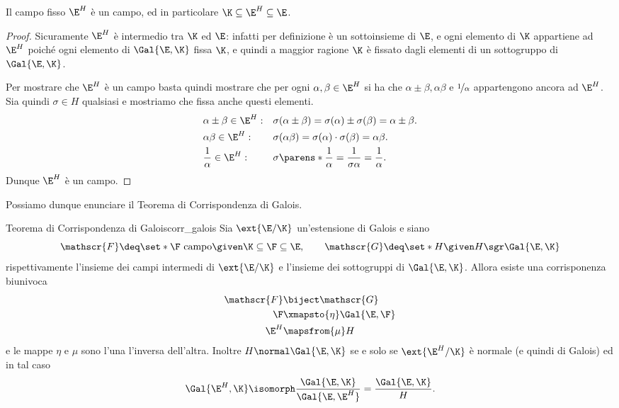 \begin{proposition}
    {}{}
    Il campo fisso $\E^H$ è un campo, ed in particolare $\K \subseteq \E^H \subseteq \E$. 
\end{proposition}
\begin{proof}
    Sicuramente $\E^H$ è intermedio tra $\K$ ed $\E$: infatti per definizione è un sottoinsieme di $\E$, e ogni elemento di $\K$ appartiene ad $\E^H$ poiché ogni elemento di $\Gal{\E, \K}$ fissa $\K$, e quindi a maggior ragione $\K$ è fissato dagli elementi di un sottogruppo di $\Gal{\E, \K}$.
    
    Per mostrare che $\E^H$ è un campo basta quindi mostrare che per ogni $\alpha, \beta \in \E^H$ si ha che $\alpha \pm \beta, \alpha\beta$ e $\nicefrac1\alpha$ appartengono ancora ad $\E^H$. Sia quindi $\sigma \in H$ qualsiasi e mostriamo che fissa anche questi elementi. \begin{align*}
        &\alpha\pm\beta \in \E^H: &&\sigma(\alpha\pm\beta) = \sigma(\alpha) \pm \sigma(\beta) = \alpha\pm\beta.\\
        &\alpha\beta \in \E^H: &&\sigma(\alpha\beta) = \sigma(\alpha)\cdot\sigma(\beta) = \alpha\beta.\\
        &\frac1{\alpha} \in \E^H: &&\sigma\parens*{\frac{1}{\alpha}} = \frac{1}{\sigma{\alpha}} = \frac{1}{\alpha}.
    \end{align*}
    Dunque $\E^H$ è un campo. 
\end{proof}

Possiamo dunque enunciare il Teorema di Corrispondenza di Galois.

\begin{theorem}
    {Teorema di Corrispondenza di Galois}{corr_galois}
    Sia $\ext{\E / \K}$ un'estensione di Galois e siano \[
        \mathscr{F} \deq \set*{\F \text{ campo} \given \K \subseteq \F \subseteq \E}, \qquad \mathscr{G} \deq \set*{H \given H \sgr \Gal{\E, \K}}
    \] rispettivamente l'insieme dei campi intermedi di $\ext{\E / \K}$ e l'insieme dei sottogruppi di $\Gal{\E, \K}$.
    Allora esiste una corrisponenza biunivoca \begin{equation}
        \begin{aligned}
            \mathscr{F} &\biject \mathscr{G}\\
            \F &\xmapsto{\eta} \Gal{\E, \F}\\
            \E^H &\mapsfrom{\mu} H
        \end{aligned}
    \end{equation} e le mappe $\eta$ e $\mu$ sono l'una l'inversa dell'altra. Inoltre $H \normal \Gal{\E, \K}$ se e solo se $\ext{\E^H / \K}$ è normale (e quindi di Galois) ed in tal caso \[
        \Gal{\E^H, \K} \isomorph \frac{\Gal{\E, \K}}{\Gal{\E, \E^H}} = \frac{\Gal{\E, \K}}{H}.
    \]
\end{theorem}

